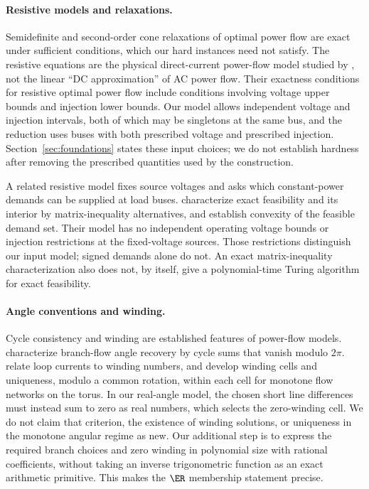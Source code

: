 \paragraph{Resistive models and relaxations.}
Semidefinite \citep{LavaeiLow2012} and second-order cone
\citep{FarivarLow2013,GanLow2014} relaxations of optimal power flow are
exact under sufficient conditions, which our hard instances need not
satisfy. The resistive equations are the physical direct-current power-flow
model studied by \citet{GanLow2014}, not the linear ``DC approximation'' of
AC power flow. Their exactness conditions for resistive optimal power flow
include conditions involving voltage upper bounds and injection lower
bounds. Our model allows independent voltage and injection intervals, both of which may
be singletons at the same bus, and the reduction uses buses with both
prescribed voltage and prescribed injection. Section~\ref{sec:foundations}
states these input choices; we do not establish hardness after removing
the prescribed quantities used by the construction.

A related resistive model fixes source voltages and asks which
constant-power demands can be supplied at load buses.
\citet[Theorems 3.18 and 3.22]{JeeningaEtAl2023} characterize exact
feasibility and its interior by matrix-inequality alternatives, and
establish convexity of the feasible demand set. Their model has no
independent operating voltage bounds or injection restrictions at the
fixed-voltage sources. Those restrictions distinguish our input model;
signed demands alone do not. An exact matrix-inequality characterization
also does not, by itself, give a polynomial-time Turing algorithm for exact
feasibility.

\paragraph{Angle conventions and winding.}
Cycle consistency and winding are established features of power-flow
models. \citet[Theorem 2]{FarivarLow2013} characterize branch-flow angle
recovery by cycle sums that vanish modulo $2\pi$.
\citet{DelabaysEtAl2016} relate loop currents to winding numbers, and
\citet{JafarpourEtAl2022} develop winding cells and uniqueness, modulo a
common rotation, within each cell for monotone flow networks on the torus.
In our real-angle model, the chosen short line differences must instead sum
to zero as real numbers, which selects the zero-winding cell. We do not
claim that criterion, the existence of winding solutions, or uniqueness in
the monotone angular regime as new. Our additional step is to express the
required branch choices and zero winding in polynomial size with rational
coefficients, without taking an inverse trigonometric function as an exact
arithmetic primitive. This makes the $\ER$ membership statement precise.

